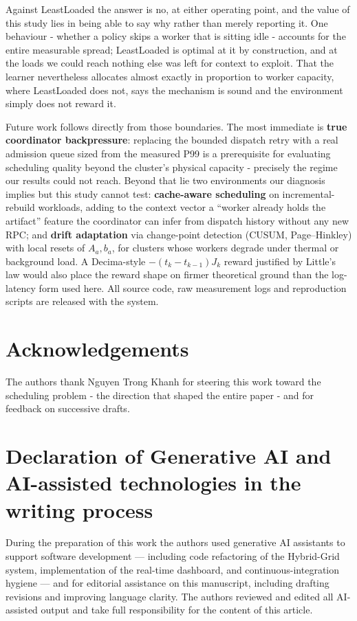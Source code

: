 \documentclass[final,5p,times,twocolumn]{elsarticle}
\begin{document}
Against LeastLoaded the answer is no, at either operating point, and the value of this study lies in being able to say why rather than merely reporting it. One behaviour - whether a policy skips a worker that is sitting idle - accounts for the entire measurable spread; LeastLoaded is optimal at it by construction, and at the loads we could reach nothing else was left for context to exploit. That the learner nevertheless allocates almost exactly in proportion to worker capacity, where LeastLoaded does not, says the mechanism is sound and the environment simply does not reward it.

Future work follows directly from those boundaries. The most immediate is \textbf{true coordinator backpressure}: replacing the bounded dispatch retry with a real admission queue sized from the measured P99 is a prerequisite for evaluating scheduling quality beyond the cluster's physical capacity - precisely the regime our results could not reach. Beyond that lie two environments our diagnosis implies but this study cannot test: \textbf{cache-aware scheduling} on incremental-rebuild workloads, adding to the context vector a ``worker already holds the artifact'' feature the coordinator can infer from dispatch history without any new RPC; and \textbf{drift adaptation} via change-point detection (CUSUM, Page--Hinkley) with local resets of $A_a,b_a$, for clusters whose workers degrade under thermal or background load. A Decima-style $-(t_k-t_{k-1})J_k$ reward justified by Little's law would also place the reward shape on firmer theoretical ground than the log-latency form used here. All source code, raw measurement logs and reproduction scripts are released with the system.

\section*{Acknowledgements}

The authors thank Nguyen Trong Khanh for steering this work toward the scheduling problem - the direction that shaped the entire paper - and for feedback on successive drafts.

\section*{Declaration of Generative AI and AI-assisted technologies in the writing process}

During the preparation of this work the authors used generative AI assistants to support software development --- including code refactoring of the Hybrid-Grid system, implementation of the real-time dashboard, and continuous-integration hygiene --- and for editorial assistance on this manuscript, including drafting revisions and improving language clarity. The authors reviewed and edited all AI-assisted output and take full responsibility for the content of this article.
\end{document}
